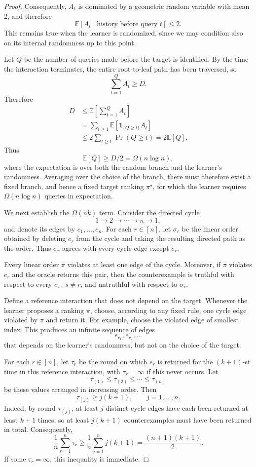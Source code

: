 \documentclass[11pt]{article}
\theoremstyle{definition}
\theoremstyle{remark}
\begin{document}
\begin{proof}
Consequently, $A_t$ is dominated by a geometric random variable with mean
$2$, and therefore
\[
    \mathbb E[A_t\mid\text{history before query }t]\leq 2.
\]
This remains true when the learner is randomized, since we may condition
also on its internal randomness up to this point.

Let $Q$ be the number of queries made before the target is identified. By
the time the interaction terminates, the entire root-to-leaf path has been
traversed, so
\[
    \sum_{t=1}^{Q} A_t\geq D.
\]
Therefore
\begin{align*}
    D
    &\leq
    \mathbb E\left[\sum_{t=1}^{Q}A_t\right] \\
    &=
    \sum_{t\geq1}
    \mathbb E\left[
        \mathbf 1_{\{Q\geq t\}}A_t
    \right] \\
    &\leq
    2\sum_{t\geq1}\Pr(Q\geq t)
    =
    2\mathbb E[Q].
\end{align*}
Thus
\[
    \mathbb E[Q]\geq D/2=\Omega(n\log n),
\]
where the expectation is over both the random branch and the learner's
randomness. Averaging over the choice of the branch, there must therefore
exist a fixed branch, and hence a fixed target ranking $\pi^\star$, for
which the learner requires $\Omega(n\log n)$ queries in expectation.

We next establish the $\Omega(nk)$ term. Consider the directed cycle
\[
    1\to2\to\cdots\to n\to1,
\]
and denote its edges by $e_1,\ldots,e_n$. For each $r\in[n]$, let
$\sigma_r$ be the linear order obtained by deleting $e_r$ from the cycle
and taking the resulting directed path as the order. Thus $\sigma_r$ agrees
with every cycle edge except $e_r$.

Every linear order $\pi$ violates at least one edge of the cycle. Moreover,
if $\pi$ violates $e_r$ and the oracle returns this pair, then the
counterexample is truthful with respect to every $\sigma_s$, $s\neq r$,
and untruthful with respect to $\sigma_r$.

Define a reference interaction that does not depend on the target. Whenever
the learner proposes a ranking $\pi$, choose, according to any fixed rule,
one cycle edge violated by $\pi$ and return it. For example, choose the
violated edge of smallest index. This produces an infinite sequence of
edges
\[
    e_{r_1},e_{r_2},\ldots
\]
that depends on the learner's randomness, but not on the choice of the
target.

For each $r\in[n]$, let $\tau_r$ be the round on which $e_r$ is returned
for the $(k+1)$-st time in this reference interaction, with
$\tau_r=\infty$ if this never occurs. Let
\[
    \tau_{(1)}\leq\tau_{(2)}\leq\cdots\leq\tau_{(n)}
\]
be these values arranged in increasing order. Then
\[
    \tau_{(j)}\geq j(k+1),
    \qquad j=1,\ldots,n.
    \tag{21}\label{eq:cycle-hitting-times}
\]
Indeed, by round $\tau_{(j)}$, at least $j$ distinct cycle edges have each
been returned at least $k+1$ times, so at least $j(k+1)$ counterexamples
must have been returned in total. Consequently,
\[
    \frac1n\sum_{r=1}^n \tau_r
    \geq
    \frac1n\sum_{j=1}^n j(k+1)
    =
    \frac{(n+1)(k+1)}2.
    \tag{22}\label{eq:average-cycle-hitting-time}
\]
If some $\tau_r=\infty$, this inequality is immediate.


\end{proof}
\end{document}
